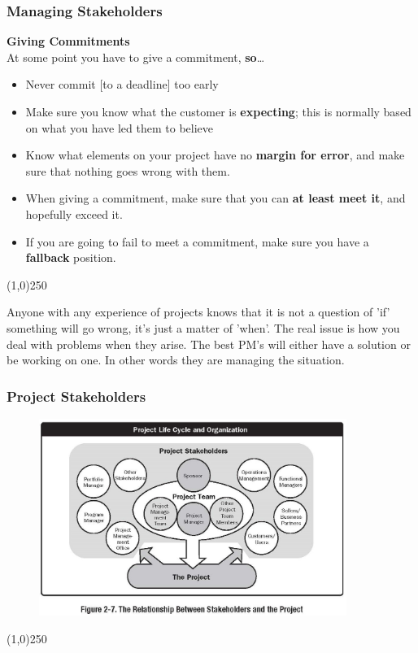 \begin{frame}
\frametitle{Managing Stakeholders}
\textbf{Giving Commitments}\\
At some point you have to give a commitment, \textbf{so}\dots
\begin{itemize}
\item Never commit [to a deadline] too early
\item Make sure you know what the customer is \textbf{expecting}; this is normally based on what you have led them to believe
\item Know what elements on your project have no \textbf{margin for error}, and make sure that nothing goes wrong with them.
\item When giving a commitment, make sure that you can \textbf{at least meet it}, and hopefully exceed it.
\item If you are going to fail to meet a commitment, make sure you have a \textbf{fallback} position.
\end{itemize}
\end{frame}
\begin{center}\line(1,0){250}\end{center}
Anyone with any experience of projects knows that it is not a question of 'if' something will go wrong, it's just a matter of 'when'.  The real issue is how you deal with problems when they arise.  The best PM's will either have a solution or be working on one.  In other words they are managing the situation.


\begin{frame}
\frametitle{Project Stakeholders}
 \begin{figure}
 	\centering
 		\includegraphics[width = 10cm]{images/Fig2-7.jpg}
 	\label{fig:2-7}
 \end{figure}
\end{frame}
\begin{center}\line(1,0){250}\end{center}






